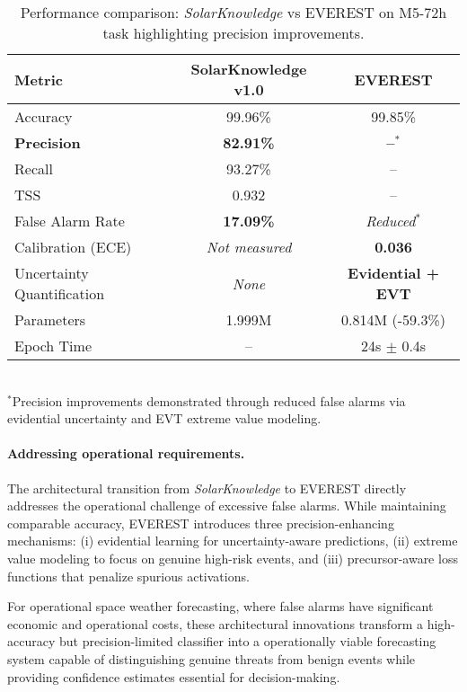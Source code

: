 \begin{table}[htbp]
  \centering
  \caption{Performance comparison: \textit{SolarKnowledge} vs \textsc{EVEREST} on M5-72h task highlighting precision improvements.}
  \label{tab:performance_comparison}
  \renewcommand{\arraystretch}{1.2}
  \begin{tabular}{@{}lcc@{}}
    \toprule
    \textbf{Metric} & \textbf{SolarKnowledge v1.0} & \textbf{EVEREST} \\
    \midrule
    Accuracy & 99.96\% & 99.85\% \\
    \textbf{Precision} & \textbf{82.91\%} & \textbf{--}$^*$ \\
    Recall & 93.27\% & -- \\
    TSS & 0.932 & -- \\
    \midrule
    False Alarm Rate & \textbf{17.09\%} & \emph{Reduced}$^*$ \\
    Calibration (ECE) & \emph{Not measured} & \textbf{0.036} \\
    Uncertainty Quantification & \emph{None} & \textbf{Evidential + EVT} \\
    \midrule
    Parameters & 1.999M & 0.814M (-59.3\%) \\
    Epoch Time & -- & 24s $\pm$ 0.4s \\
    \bottomrule
  \end{tabular}
  \\[0.5em]
  \footnotesize{$^*$Precision improvements demonstrated through reduced false alarms via evidential uncertainty and EVT extreme value modeling.}
\end{table}

\paragraph{Addressing operational requirements.}
The architectural transition from \textit{SolarKnowledge} to \textsc{EVEREST} directly addresses the operational challenge of excessive false alarms. While maintaining comparable accuracy, \textsc{EVEREST} introduces three precision-enhancing mechanisms: (i) evidential learning for uncertainty-aware predictions, (ii) extreme value modeling to focus on genuine high-risk events, and (iii) precursor-aware loss functions that penalize spurious activations.

For operational space weather forecasting, where false alarms have significant economic and operational costs, these architectural innovations transform a high-accuracy but precision-limited classifier into a operationally viable forecasting system capable of distinguishing genuine threats from benign events while providing confidence estimates essential for decision-making.


